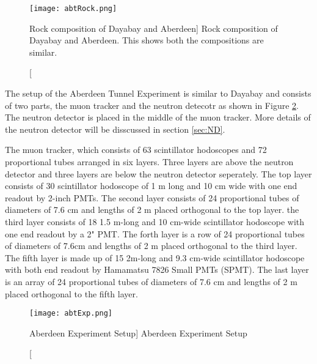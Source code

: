 \begin{figure}
    \label{fig:abtRock.png}
    \centering
    \texttt{[image: abtRock.png]}
    \caption
    [Rock composition of Dayabay and Aberdeen]
    {Rock composition of Dayabay and Aberdeen. This shows both the compositions are similar.}
    \end{figure}


The setup of the Aberdeen Tunnel Experiment is similar to Dayabay and consists of
two parts, the muon tracker and the neutron detecotr as shown in Figure \ref{fig:abtExp.png}. The neutron detector is placed in the
middle of the muon tracker.
More details of the neutron detector will be disscussed in section \ref{sec:ND}.

The muon tracker, which consists of 63 scintillator hodoscopes and 72 proportional
tubes arranged in six layers.
Three layers are above the neutron detector and three layers are below the neutron detector seperately.
The top layer consists of 30 scintillator hodoscope of 1 m long and 10 cm wide with
one end readout by 2-inch PMTs. The second layer consists of 24 proportional tubes of diameters of
7.6 cm and lengths of 2 m placed orthogonal to the top layer. the third layer consists of 18 1.5 m-long
and 10 cm-wide scintillator hodoscope with one end readout by a 2" PMT. The forth layer is a row
of 24 proportional tubes of diameters of 7.6cm and lengths of 2 m placed orthogonal to the third layer.
The fifth layer is made up of 15 2m-long and 9.3 cm-wide scintillator hodoscope with both end
readout by Hamamatsu 7826 Small PMTs (SPMT). The last layer is an array of 24 proportional tubes
of diameters of 7.6 cm and lengths of 2 m placed  orthogonal to the fifth layer.




\begin{figure}
    \label{fig:abtExp.png}
    \centering
    \texttt{[image: abtExp.png]}
    \caption
    [Aberdeen Experiment Setup]
    {Aberdeen Experiment Setup}
    \end{figure}


